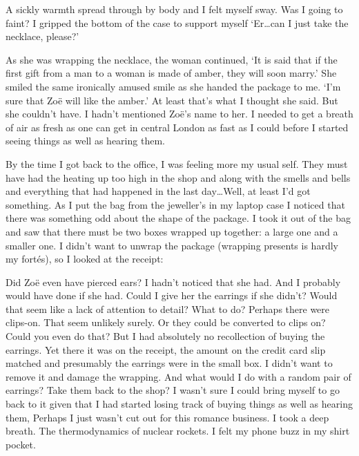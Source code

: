 A sickly warmth spread through by body and I felt myself sway. Was I
going to faint? I gripped the bottom of the case to support myself
`Er\dots can I just take the necklace, please?'

As she was wrapping the necklace, the woman continued, `It is said
that if the first gift from a man to a woman is made of amber, they
will soon marry.' She smiled the same ironically amused smile as she
handed the package to me. `I'm sure that Zoë will like the
amber.' At least that's what I thought she said. But she couldn't
have. I hadn't mentioned Zoë's name to her. I needed to get a
breath of air as fresh as one can get in central London as fast as I
could before I started seeing things as well as hearing them.

By the time I got back to the office, I was feeling more my usual
self. They must have had the heating up too high in the shop and
along with the smells and bells and everything that had happened in
the last day\dots Well, at least I'd got something. As I put the bag
from the jeweller's in my laptop case I noticed that there was
something odd about the shape of the package. I took it out of the
bag and saw that there must be two boxes wrapped up together: a
large one and a smaller one. I didn't want to unwrap the package
(wrapping presents is hardly my fortés), so I looked at the
receipt:

\startreceipt
{}
\receiptdash
{}
\stopreceipt

Did Zoë even have pierced ears? I hadn't noticed that she had. And I probably would have done if she had.
Could I give her the earrings if she didn't? Would that seem like a lack of attention to detail?  What to do? Perhaps there were clips-on. That seem unlikely surely. Or they could be converted to clips on? Could you even do that? But I had absolutely no recollection of
buying the earrings. Yet there it was on the receipt, the amount on
the credit card slip matched and presumably the earrings were in the
small box. I didn't want to remove it and damage the wrapping. And what would I do with a random pair of earrings? Take them back to the shop? I wasn't sure I could bring myself to go back to it given that I had started losing track of buying things as well as
hearing them, Perhaps I just wasn't cut out for this romance business.
I took a deep breath. The thermodynamics of nuclear rockets. I felt
my phone buzz in my shirt pocket.

